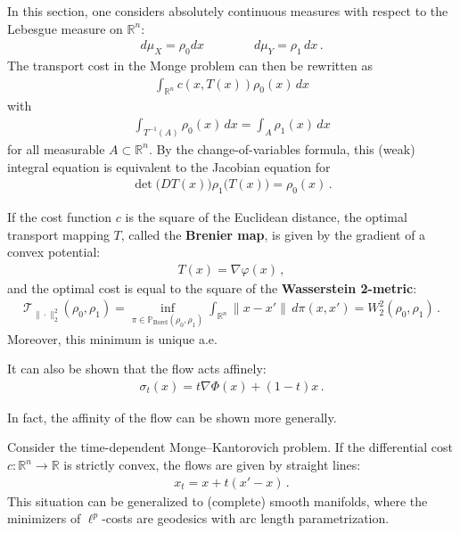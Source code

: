     In this section, one considers absolutely continuous measures with respect to the Lebesgue measure on $\mathbb{R}^n$:
    \begin{gather}
        d\mu_X = \rho_0dx\qquad\qquad d\mu_Y = \rho_1\,dx\,.
    \end{gather}
    The transport cost in the Monge problem can then be rewritten as
    \begin{gather}
        \int_{\mathbb{R}^n}c(x,T(x))\rho_0(x)\,dx
    \end{gather}
    with
    \begin{gather}
        \int_{T^{-1}(A)}\rho_0(x)\,dx = \int_A\rho_1(x)\,dx
    \end{gather}
    for all measurable $A\subset\mathbb{R}^n$. By the change-of-variables formula, this (weak) integral equation is equivalent to the Jacobian equation for
    \begin{gather}
        \det\bigl(DT(x)\bigr)\rho_1\bigl(T(x)\bigr)=\rho_0(x)\,.
    \end{gather}

    \begin{example}
        If the cost function $c$ is the square of the Euclidean distance, the optimal transport mapping $T$, called the \textbf{Brenier map}, is given by the gradient of a convex potential:
        \begin{gather}
            T(x) = \nabla\varphi(x)\,,
        \end{gather}
        and the optimal cost is equal to the square of the \textbf{Wasserstein 2-metric}:
        \begin{gather}
            \mathcal{T}_{\|\cdot\|_2^2}(\rho_0,\rho_1) = \inf_{\pi\in\mathbb{P}_{\text{Borel}}(\rho_0,\rho_1)}\int_{\mathbb{R}^n}\|x-x'\|\,d\pi(x,x')=W^2_2(\rho_0,\rho_1)\,.
        \end{gather}
        Moreover, this minimum is unique a.e.

        It can also be shown that the flow acts affinely:
        \begin{gather}
            \sigma_t(x) = t\nabla\Phi(x) + (1-t)x\,.
        \end{gather}
    \end{example}

    In fact, the affinity of the flow can be shown more generally.
    \begin{property}
        Consider the time-dependent Monge--Kantorovich problem. If the differential cost $c:\mathbb{R}^n\rightarrow\mathbb{R}$ is strictly convex, the flows are given by straight lines:
        \begin{gather}
            x_t = x + t(x'-x)\,.
        \end{gather}
        This situation can be generalized to (complete) smooth manifolds, where the minimizers of $\ell^p$-costs are geodesics with arc length parametrization.
    \end{property}

